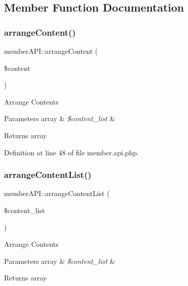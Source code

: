 \subsection{Member Function Documentation}
\hypertarget{classmemberAPI_a2f05be1a71de779b38ea5c0e113969ea}{}\label{classmemberAPI_a2f05be1a71de779b38ea5c0e113969ea} 
\subsubsection{\texorpdfstring{arrange\+Content()}{arrangeContent()}}
{\footnotesize\ttfamily member\+A\+P\+I\+::arrange\+Content (\begin{DoxyParamCaption}\item[{}]{\$content }\end{DoxyParamCaption})}

Arrange Contents


\begin{DoxyParams}[1]{Parameters}
array & {\em \$content\+\_\+list} & \\
\hline
\end{DoxyParams}
\begin{DoxyReturn}{Returns}
array 
\end{DoxyReturn}


Definition at line 48 of file member.\+api.\+php.

\hypertarget{classmemberAPI_accb093980616ddbea40361249379a01b}{}\label{classmemberAPI_accb093980616ddbea40361249379a01b} 
\subsubsection{\texorpdfstring{arrange\+Content\+List()}{arrangeContentList()}}
{\footnotesize\ttfamily member\+A\+P\+I\+::arrange\+Content\+List (\begin{DoxyParamCaption}\item[{}]{\$content\+\_\+list }\end{DoxyParamCaption})}

Arrange Contents


\begin{DoxyParams}[1]{Parameters}
array & {\em \$content\+\_\+list} & \\
\hline
\end{DoxyParams}
\begin{DoxyReturn}{Returns}
array 
\end{DoxyReturn}


